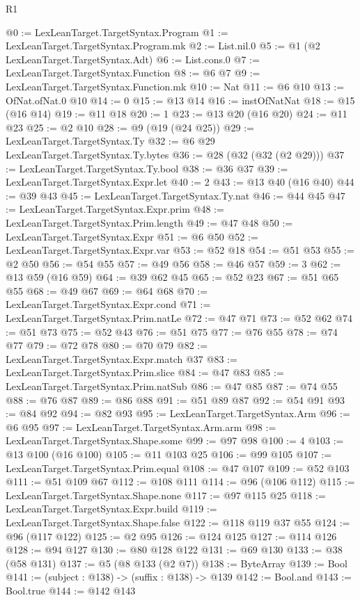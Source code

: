 \begin{lexlean}{R1}
\begin{coremodule}
@0 := LexLeanTarget.TargetSyntax.Program
@1 := LexLeanTarget.TargetSyntax.Program.mk
@2 := List.nil.{0}
@5 := @1 (@2 LexLeanTarget.TargetSyntax.Adt)
@6 := List.cons.{0}
@7 := LexLeanTarget.TargetSyntax.Function
@8 := @6 @7
@9 := LexLeanTarget.TargetSyntax.Function.mk
@10 := Nat
@11 := @6 @10
@13 := OfNat.ofNat.{0} @10
@14 := 0
@15 := @13 @14
@16 := instOfNatNat
@18 := @15 (@16 @14)
@19 := @11 @18
@20 := 1
@23 := @13 @20 (@16 @20)
@24 := @11 @23
@25 := @2 @10
@28 := @9 (@19 (@24 @25))
@29 := LexLeanTarget.TargetSyntax.Ty
@32 := @6 @29 LexLeanTarget.TargetSyntax.Ty.bytes
@36 := @28 (@32 (@32 (@2 @29)))
@37 := LexLeanTarget.TargetSyntax.Ty.bool
@38 := @36 @37
@39 := LexLeanTarget.TargetSyntax.Expr.let
@40 := 2
@43 := @13 @40 (@16 @40)
@44 := @39 @43
@45 := LexLeanTarget.TargetSyntax.Ty.nat
@46 := @44 @45
@47 := LexLeanTarget.TargetSyntax.Expr.prim
@48 := LexLeanTarget.TargetSyntax.Prim.length
@49 := @47 @48
@50 := LexLeanTarget.TargetSyntax.Expr
@51 := @6 @50
@52 := LexLeanTarget.TargetSyntax.Expr.var
@53 := @52 @18
@54 := @51 @53
@55 := @2 @50
@56 := @54 @55
@57 := @49 @56
@58 := @46 @57
@59 := 3
@62 := @13 @59 (@16 @59)
@64 := @39 @62 @45
@65 := @52 @23
@67 := @51 @65 @55
@68 := @49 @67
@69 := @64 @68
@70 := LexLeanTarget.TargetSyntax.Expr.cond
@71 := LexLeanTarget.TargetSyntax.Prim.natLe
@72 := @47 @71
@73 := @52 @62
@74 := @51 @73
@75 := @52 @43
@76 := @51 @75
@77 := @76 @55
@78 := @74 @77
@79 := @72 @78
@80 := @70 @79
@82 := LexLeanTarget.TargetSyntax.Expr.match @37
@83 := LexLeanTarget.TargetSyntax.Prim.slice
@84 := @47 @83
@85 := LexLeanTarget.TargetSyntax.Prim.natSub
@86 := @47 @85
@87 := @74 @55
@88 := @76 @87
@89 := @86 @88
@91 := @51 @89 @87
@92 := @54 @91
@93 := @84 @92
@94 := @82 @93
@95 := LexLeanTarget.TargetSyntax.Arm
@96 := @6 @95
@97 := LexLeanTarget.TargetSyntax.Arm.arm
@98 := LexLeanTarget.TargetSyntax.Shape.some
@99 := @97 @98
@100 := 4
@103 := @13 @100 (@16 @100)
@105 := @11 @103 @25
@106 := @99 @105
@107 := LexLeanTarget.TargetSyntax.Prim.equal
@108 := @47 @107
@109 := @52 @103
@111 := @51 @109 @67
@112 := @108 @111
@114 := @96 (@106 @112)
@115 := LexLeanTarget.TargetSyntax.Shape.none
@117 := @97 @115 @25
@118 := LexLeanTarget.TargetSyntax.Expr.build
@119 := LexLeanTarget.TargetSyntax.Shape.false
@122 := @118 @119 @37 @55
@124 := @96 (@117 @122)
@125 := @2 @95
@126 := @124 @125
@127 := @114 @126
@128 := @94 @127
@130 := @80 @128 @122
@131 := @69 @130
@133 := @38 (@58 @131)
@137 := @5 (@8 @133 (@2 @7))
@138 := ByteArray
@139 := Bool
@141 := (subject : @138) -> (suffix : @138) -> @139
@142 := Bool.and
@143 := Bool.true
@144 := @142 @143

\end{coremodule}
\end{lexlean}
